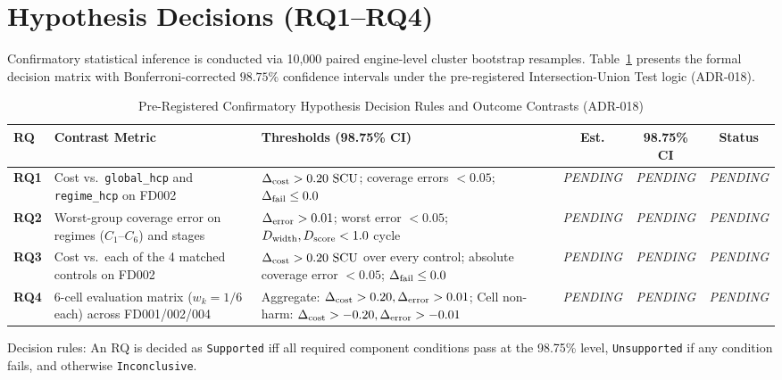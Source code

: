 \section{Hypothesis Decisions (RQ1--RQ4)}
Confirmatory statistical inference is conducted via 10,000 paired engine-level cluster bootstrap resamples. Table~\ref{tab:thesis_hypothesis_matrix} presents the formal decision matrix with Bonferroni-corrected $98.75\%$ confidence intervals under the pre-registered Intersection-Union Test logic (ADR-018).

\begin{table}[htbp]
\centering
\small
\caption{Pre-Registered Confirmatory Hypothesis Decision Rules and Outcome Contrasts (ADR-018)}
\label{tab:thesis_hypothesis_matrix}
\begin{tabular}{lp{3.2cm}p{4.2cm}ccc}
\toprule
\textbf{RQ} & \textbf{Contrast Metric} & \textbf{Thresholds (98.75\% CI)} & \textbf{Est.} & \textbf{98.75\% CI} & \textbf{Status} \\
\midrule
\textbf{RQ1} & Cost vs.\ \texttt{global\_hcp} and \texttt{regime\_hcp} on FD002 & $\Delta_{\text{cost}} > 0.20~\text{SCU}$; coverage errors $< 0.05$; $\Delta_{\text{fail}} \le 0.0$ & \textit{PENDING} & \textit{PENDING} & \textit{PENDING} \\
\midrule
\textbf{RQ2} & Worst-group coverage error on regimes ($C_1$--$C_6$) and stages & $\Delta_{\text{error}} > 0.01$; worst error $< 0.05$; $D_{\text{width}}, D_{\text{score}} < 1.0$ cycle & \textit{PENDING} & \textit{PENDING} & \textit{PENDING} \\
\midrule
\textbf{RQ3} & Cost vs.\ each of the 4 matched controls on FD002 & $\Delta_{\text{cost}} > 0.20~\text{SCU}$ over every control; absolute coverage error $< 0.05$; $\Delta_{\text{fail}} \le 0.0$ & \textit{PENDING} & \textit{PENDING} & \textit{PENDING} \\
\midrule
\textbf{RQ4} & 6-cell evaluation matrix ($w_k=1/6$ each) across FD001/002/004 & Aggregate: $\Delta_{\text{cost}} > 0.20, \Delta_{\text{error}} > 0.01$; Cell non-harm: $\Delta_{\text{cost}} > -0.20, \Delta_{\text{error}} > -0.01$ & \textit{PENDING} & \textit{PENDING} & \textit{PENDING} \\
\bottomrule
\end{tabular}
\begin{flushleft}
\footnotesize Decision rules: An RQ is decided as \texttt{Supported} iff all required component conditions pass at the 98.75\% level, \texttt{Unsupported} if any condition fails, and otherwise \texttt{Inconclusive}.
\end{flushleft}
\end{table}

